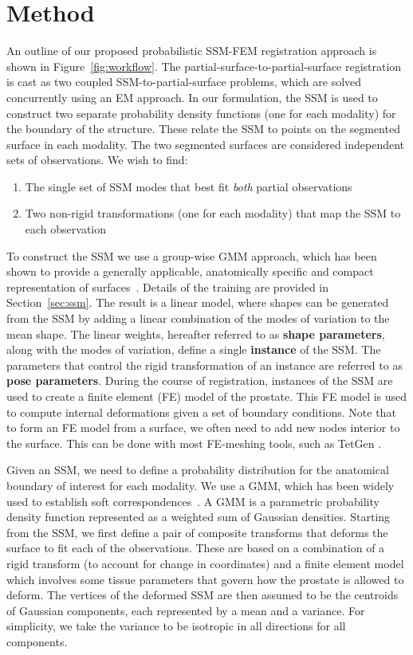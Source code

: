 \documentclass[journal]{IEEEtran}
\begin{document}
\section{Method}
An outline of our proposed probabilistic SSM-FEM registration approach is shown in Figure~\ref{fig:workflow}. The partial-surface-to-partial-surface registration is cast as two coupled SSM-to-partial-surface problems, which are solved concurrently using an EM approach. In our formulation, the SSM is used to construct two separate probability density functions (one for each modality) for the boundary of the structure.  These relate the SSM to points on the segmented surface in each modality.  The two segmented surfaces are considered independent sets of observations.  We wish to find:
\begin{enumerate}
	\renewcommand{\theenumi}{\alph{enumi}} %
	\item The single set of SSM modes that best fit \emph{both} partial observations
	\item Two non-rigid transformations (one for each modality) that map the SSM to each observation
\end{enumerate}

To construct the SSM we use a group-wise GMM approach, which has been shown to provide a generally applicable, anatomically specific and compact~\cite{Styner03a} representation of surfaces~\cite{Rasoulian12b}. Details of the training are provided in Section~\ref{sec:ssm}. The result is a linear model, where shapes can be generated from the SSM by adding a linear combination of the modes of variation to the mean shape.  The linear weights, hereafter referred to as \textbf{shape parameters}, along with the modes of variation, define a single \textbf{instance} of the SSM. The parameters that control the rigid transformation of an instance are referred to as \textbf{pose parameters}. During the course of registration, instances of the SSM are used to create a finite element (FE) model of the prostate. This FE model is used to compute internal deformations given a set of boundary conditions. Note that to form an FE model from a surface, we often need to add new nodes interior to the surface. This can be done with most FE-meshing tools, such as TetGen \cite{Si06a}.

Given an SSM, we need to define a probability distribution for the anatomical boundary of interest for each modality.  We use a GMM, which has been widely used to establish soft correspondences~\cite{Myronenko10a,Rasoulian12a,Jian11a}. A GMM is a parametric probability density function represented as a weighted sum of Gaussian densities. Starting from the SSM, we first define a pair of composite transforms that deforms the surface to fit each of the observations.  These are based on a combination of a rigid transform (to account for change in coordinates) and a finite element model which involves some tissue parameters that govern how the prostate is allowed to deform.  The vertices of the deformed SSM are then assumed to be the centroids of Gaussian components, each represented by a mean and a variance. For simplicity, we take the variance to be isotropic in all directions for all components.
\end{document}
